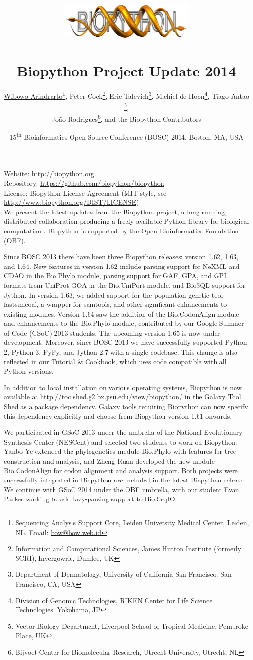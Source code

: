 \documentclass[10pt,oneside]{article}
\title{%
\vspace{-1.5in}
\includegraphics[width=0.5\textwidth]{biopython.jpg}\\
~\\Biopython Project Update 2014}
\author{
    \underline{Wibowo Arindrarto}\footnote{Sequencing Analysis Support Core, Leiden University Medical Center, Leiden, NL. Email: \href{mailto:bow@bow.web.id}{bow@bow.web.id}},
    Peter Cock\footnote{Information and Computational Sciences, James Hutton Institute (formerly SCRI), Invergowrie, Dundee, UK},
    Eric Talevich\footnote{Department of Dermatology, University of California San Francisco, San Francisco, CA, USA},
    Michiel de Hoon\footnote{Division of Genomic Technologies, RIKEN Center for Life Science Technologies, Yokohama, JP},
    Tiago Antao \footnote{Vector Biology Department, Liverpool School of Tropical Medicine, Pembroke Place, UK},
    \\
    Jo\~{a}o Rodrigues\footnote{Bijvoet Center for Biomolecular Research, Utrecht University, Utrecht, NL},
    and the Biopython Contributors}
\date{15\textsuperscript{th} Bioinformatics Open Source Conference (BOSC) 2014, Boston, MA, USA}
\begin{document}
\maketitle
\thispagestyle{empty}

\vspace{-0.2in}
\noindent
Website: \url{http://biopython.org} \\
Repository: \url{https://github.com/biopython/biopython} \\
License: Biopython License Agreement (MIT style, see \url{http://www.biopython.org/DIST/LICENSE}) \\

We present the latest updates from the Biopython project, a long-running,
distributed collaboration producing a freely available Python library for
biological computation \citep{AppNote}. Biopython is supported by the Open
Bioinformatics Foundation (OBF).

Since BOSC 2013 there have been three Biopython releases: version 1.62, 1.63,
and 1.64. New features in version 1.62 include parsing support for NeXML and
CDAO in the Bio.Phylo module, parsing support for GAF, GPA, and GPI formats
from UniProt-GOA in the Bio.UniPort module, and BioSQL support for Jython.
In version 1.63, we added  support for the population genetic tool
fastsimcoal, a wrapper for samtools, and other significant enhancements to
existing modules. Version 1.64 saw the addition of the Bio.CodonAlign module
and enhancements to the Bio.Phylo module, contributed by our Google Summer
of Code (GSoC) 2013 students. The upcoming version 1.65 is now under development.
Moreover, since BOSC 2013 we have successfully supported Python 2, Python 3,
PyPy, and Jython 2.7 with a single codebase. This change is also reflected in
our Tutorial \& Cookbook, which uses code compatible with all Python versions.

In addition to local installation on various operating systems, Biopython
is now available at \url{http://toolshed.g2.bx.psu.edu/view/biopython/}
in the Galaxy Tool Shed \citep{ToolShed} as a package dependency. Galaxy tools
requiring Biopython can now specify this dependency explicitly and choose from
Biopython version 1.61 onwards.

We participated in GSoC 2013 under the umbrella of the National Evolutionary
Synthesis Center (NESCent) and selected two students to work on Biopython:
Yanbo Ye extended the phylogenetics module Bio.Phylo with features for tree
construction and analysis, and Zheng Ruan developed the new module
Bio.CodonAlign for codon alignment and analysis support. Both projects were
successfully integrated in Biopython are included in the latest Biopython
release. We continue with GSoC 2014 under the OBF umbrella, with our student
Evan Parker working to add lazy-parsing support to Bio.SeqIO.
\end{document}
